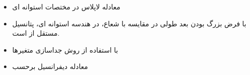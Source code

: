 \ELhold


\begin{ELunit}

\begin{itemize}
\tightlist
\item
  معادله لاپلاس در مختصات استوانه ای
\end{itemize}


\begin{itemize}
\tightlist
\item
  با فرض بزرگ بودن بعد طولی در مقایسه با شعاع، در هندسه استوانه ای، پتانسیل مستقل از  است.
\end{itemize}


\begin{itemize}
\tightlist
\item
  با استفاده از روش جداسازی متغیرها
\end{itemize}


\end{ELunit}

\begin{ELjoin}

\begin{itemize}
\tightlist
\item
  معادله دیفرانسیل برحسب \ELim{\phi}
\end{itemize}

\begin{ELimportant}{}


\end{ELimportant}

\end{ELjoin}

